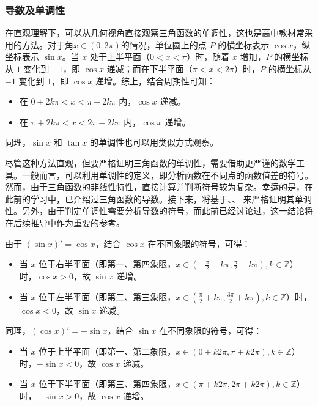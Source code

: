 \subsubsection{导数及单调性}

在直观理解下，可以从几何视角直接观察三角函数的单调性，这也是高中教材常采用的方法。对于角$x\in(0,2\pi)$的情况，单位圆上的点 $P$ 的横坐标表示 $\cos x$，纵坐标表示 $\sin x$。当 $x$ 处于上半平面（$0 < x < \pi$）时，随着 $x$ 增加，$P$ 的横坐标从 $1$ 变化到 $-1$，即 $\cos x$ 递减；而在下半平面（$\pi < x < 2\pi$）时，$P$ 的横坐标从 $-1$ 变化到 $1$，即 $\cos x$ 递增。综上，结合周期性可知：
\begin{itemize}
\item 在 $0 + 2k\pi < x < \pi + 2k\pi$ 内，$\cos x$ 递减。
\item 在 $\pi + 2k\pi < x < 2\pi + 2k\pi$ 内，$\cos x$ 递增。
\end{itemize}
同理，$\sin x$ 和 $\tan x$ 的单调性也可以用类似方式观察。

尽管这种方法直观，但要严格证明三角函数的单调性，需要借助更严谨的数学工具。一般而言，可以利用单调性的定义，即分析函数在不同点的函数值差的符号。然而，由于三角函数的非线性特性，直接计算并判断符号较为复杂。幸运的是，在此前的学习中，已介绍过三角函数的导数。接下来，将基于、、 来严格证明其单调性。另外，由于判定单调性需要分析导数的符号，而此前已经讨论过，这一结论将在后续推导中作为重要的参考。

由于 $(\sin x)' = \cos x$，结合 $\cos x$ 在不同象限的符号，可得：
\begin{itemize}
\item 当 $x$ 位于右半平面（即第一、第四象限，$\displaystyle x \in (-\frac{\pi}{2} + k\pi, \frac{\pi}{2} + k\pi), k \in \mathbb{Z}$）时，$\cos x > 0$，故 $\sin x$ 递增。
\item 当 $x$ 位于左半平面（即第二、第三象限，$\displaystyle x \in (\frac{\pi}{2} + k\pi, \frac{3\pi}{2} + k\pi), k \in \mathbb{Z}$）时，$\cos x < 0$，故 $\sin x$ 递减。
\end{itemize}

同理，$(\cos x)' = -\sin x$，结合 $\sin x$ 在不同象限的符号，可得：
\begin{itemize}
\item 当 $x$ 位于上半平面（即第一、第二象限，$x \in (0 + k2\pi, \pi + k2\pi), k \in \mathbb{Z}$）时，$-\sin x < 0$，故 $\cos x$ 递减。
\item 当 $x$ 位于下半平面（即第三、第四象限，$x \in (\pi + k2\pi, 2\pi + k2\pi), k \in \mathbb{Z}$）时，$-\sin x > 0$，故 $\cos x$ 递增。
\end{itemize}

